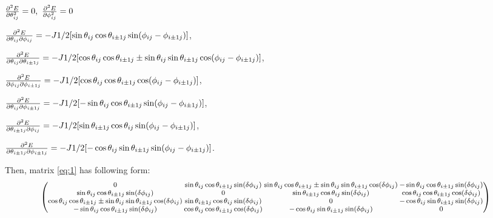 \documentclass[9pt]{report}
\begin{document}
$\pdv[2]{E}{\theta_{ij}} = 0,\ \pdv[2]{E}{\phi_{ij}} = 0$
\newline

$\pdv{E}{\theta_{ij}}{\phi_{ij}} = -J1/2[\sin\theta_{ij}\cos\theta_{i\pm1j}\sin(\phi_{ij}-\phi_{i\pm1j})]$,

$\pdv{E}{\theta_{ij}}{\theta_{i\pm1j}} = -J1/2[\cos\theta_{ij}\cos\theta_{i\pm1j}\pm\sin\theta_{ij}\sin\theta_{i\pm1j}\cos(\phi_{ij}-\phi_{i\pm1j})]$,

$\pdv{E}{\phi_{ij}}{\phi_{i\pm1j}} = -J1/2[\cos\theta_{ij}\cos\theta_{i\pm1j}\cos(\phi_{ij}-\phi_{i\pm1j})]$,

$\pdv{E}{\theta_{ij}}{\phi_{i\pm1j}} = -J1/2[-\sin\theta_{ij}\cos\theta_{i\pm1j}\sin(\phi_{ij}-\phi_{i\pm1j})]$,

$\pdv{E}{\theta_{i\pm1j}}{\phi_{ij}} = -J1/2[\sin\theta_{i\pm1j}\cos\theta_{ij}\sin(\phi_{ij}-\phi_{i\pm1j})]$,

$\pdv{E}{\theta_{i\pm1j}}{\phi_{i\pm1j}} = -J1/2[-\cos\theta_{ij}\sin\theta_{i\pm1j}\sin(\phi_{ij}-\phi_{i\pm1j})]$.
\newline

Then, matrix \eqref{eq:1} has following form:
\begin{equation*}
	\footnotesize
	\setlength\arraycolsep{1pt}
	\begin{pmatrix}
		0 & \sin\theta_{ij}\cos\theta_{i\pm1j}\sin(\delta \phi_{ij}) & \sin\theta_{ij}\cos\theta_{i\pm1j}\pm \sin\theta_{ij}\sin\theta_{i\pm1j}\cos(\delta \phi_{ij}) & -\sin\theta_{ij}\cos\theta_{i\pm1j}\sin(\delta \phi_{ij})\\
		\sin\theta_{ij}\cos\theta_{i\pm1j}\sin(\delta \phi_{ij}) & 0 & \sin\theta_{i\pm1j}\cos\theta_{ij}\sin(\delta \phi_{ij}) & \cos\theta_{ij}\cos\theta_{i\pm1j}\cos(\delta \phi_{ij})\\
		\cos\theta_{ij}\cos\theta_{i\pm1j}\pm \sin\theta_{ij}\sin\theta_{i\pm1j}\cos(\delta \phi_{ij}) & \sin\theta_{i\pm1j}\cos\theta_{ij}\sin(\delta \phi_{ij}) & 0 & -\cos\theta_{ij}\sin\theta_{i\pm1j}\sin(\delta \phi_{ij})\\
		-\sin\theta_{ij}\cos\theta_{i\pm1j}\sin(\delta \phi_{ij}) & \cos\theta_{ij}\cos\theta_{i\pm1j}\cos(\delta \phi_{ij}) & -\cos\theta_{ij}\sin\theta_{i\pm1j}\sin(\delta \phi_{ij}) & 0
	\end{pmatrix}
\end{equation*}
\end{document}
